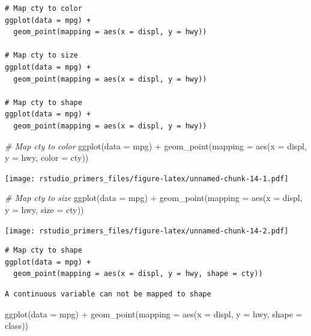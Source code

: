 \documentclass[
]{article}
\newenvironment{Shaded}{\begin{snugshade}}{\end{snugshade}}
\newcommand{\AttributeTok}[1]{\textcolor[rgb]{0.77,0.63,0.00}{#1}}
\newcommand{\CommentTok}[1]{\textcolor[rgb]{0.56,0.35,0.01}{\textit{#1}}}
\newcommand{\FunctionTok}[1]{\textcolor[rgb]{0.00,0.00,0.00}{#1}}
\newcommand{\NormalTok}[1]{#1}
\newcommand{\SpecialCharTok}[1]{\textcolor[rgb]{0.00,0.00,0.00}{#1}}
\begin{document}
\begin{verbatim}
# Map cty to color
ggplot(data = mpg) + 
  geom_point(mapping = aes(x = displ, y = hwy))

# Map cty to size
ggplot(data = mpg) + 
  geom_point(mapping = aes(x = displ, y = hwy))

# Map cty to shape
ggplot(data = mpg) + 
  geom_point(mapping = aes(x = displ, y = hwy))
\end{verbatim}

\begin{Shaded}
\begin{Highlighting}[]
\CommentTok{\# Map cty to color}
\FunctionTok{ggplot}\NormalTok{(}\AttributeTok{data =}\NormalTok{ mpg) }\SpecialCharTok{+} 
  \FunctionTok{geom\_point}\NormalTok{(}\AttributeTok{mapping =} \FunctionTok{aes}\NormalTok{(}\AttributeTok{x =}\NormalTok{ displ, }\AttributeTok{y =}\NormalTok{ hwy, }\AttributeTok{color =}\NormalTok{ cty))}
\end{Highlighting}
\end{Shaded}

\texttt{[image: rstudio\_primers\_files/figure-latex/unnamed-chunk-14-1.pdf]}

\begin{Shaded}
\begin{Highlighting}[]
\CommentTok{\# Map cty to size}
\FunctionTok{ggplot}\NormalTok{(}\AttributeTok{data =}\NormalTok{ mpg) }\SpecialCharTok{+} 
  \FunctionTok{geom\_point}\NormalTok{(}\AttributeTok{mapping =} \FunctionTok{aes}\NormalTok{(}\AttributeTok{x =}\NormalTok{ displ, }\AttributeTok{y =}\NormalTok{ hwy, }\AttributeTok{size =}\NormalTok{ cty))}
\end{Highlighting}
\end{Shaded}

\texttt{[image: rstudio\_primers\_files/figure-latex/unnamed-chunk-14-2.pdf]}

\begin{verbatim}
# Map cty to shape
ggplot(data = mpg) + 
  geom_point(mapping = aes(x = displ, y = hwy, shape = cty))
\end{verbatim}

\begin{verbatim}
A continuous variable can not be mapped to shape
\end{verbatim}

\begin{Shaded}
\begin{Highlighting}[]
\FunctionTok{ggplot}\NormalTok{(}\AttributeTok{data =}\NormalTok{ mpg) }\SpecialCharTok{+} 
  \FunctionTok{geom\_point}\NormalTok{(}\AttributeTok{mapping =} \FunctionTok{aes}\NormalTok{(}\AttributeTok{x =}\NormalTok{ displ, }\AttributeTok{y =}\NormalTok{ hwy, }\AttributeTok{shape =}\NormalTok{ class))}
\end{Highlighting}
\end{Shaded}
\end{document}
